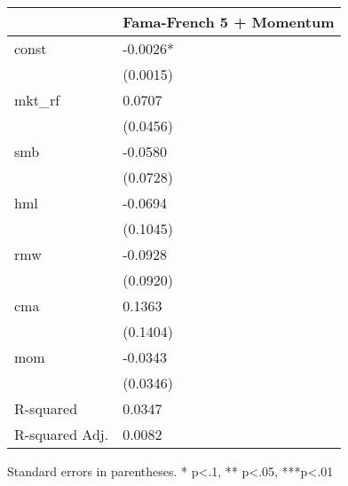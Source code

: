 \begin{table}
\caption{}
\label{}
\begin{center}
\begin{tabular}{ll}
\hline
               & Fama-French 5 + Momentum  \\
\hline
const          & -0.0026*                  \\
               & (0.0015)                  \\
mkt\_rf        & 0.0707                    \\
               & (0.0456)                  \\
smb            & -0.0580                   \\
               & (0.0728)                  \\
hml            & -0.0694                   \\
               & (0.1045)                  \\
rmw            & -0.0928                   \\
               & (0.0920)                  \\
cma            & 0.1363                    \\
               & (0.1404)                  \\
mom            & -0.0343                   \\
               & (0.0346)                  \\
R-squared      & 0.0347                    \\
R-squared Adj. & 0.0082                    \\
\hline
\end{tabular}
\end{center}
\end{table}
\bigskip
Standard errors in parentheses. \newline 
* p<.1, ** p<.05, ***p<.01